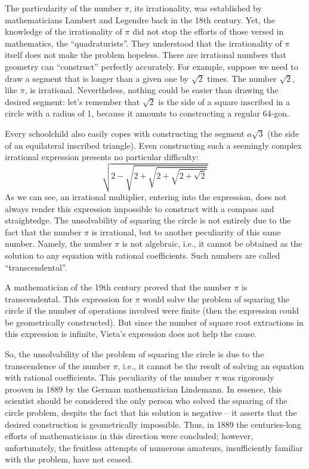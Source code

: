 The particularity of the number $\pi$, its irrationality, was established by mathematicians Lambert and Legendre back in the 18th century. Yet, the knowledge of the irrationality of $\pi$ did not stop the efforts of those versed in mathematics, the ``quadraturists''. They understood that the irrationality of $\pi$ itself does not make the problem hopeless. There are irrational numbers that geometry can ``construct'' perfectly accurately. For example, suppose we need to draw a segment that is longer than a given one by $\sqrt{2}$ times. The number $\sqrt{2}$, like $\pi$, is irrational. Nevertheless, nothing could be easier than drawing the desired segment: let's remember that $\sqrt{2}$ is the side of a square inscribed in a circle with a radius of 1, because it amounts to constructing a regular 64-gon.



Every schoolchild also easily copes with constructing the segment $ a \sqrt{3}$ (the side of an equilateral inscribed triangle). Even constructing such a seemingly complex irrational expression presents no particular difficulty:
\begin{equation*}%
\sqrt{2 - \sqrt{2 + \sqrt{2 + \sqrt{2 +\sqrt{2}}}}}
\end{equation*}
As we can see, an irrational multiplier, entering into the expression, does not always render this expression impossible to construct with a compass and straightedge. The unsolvability of squaring the circle is not entirely due to the fact that the number $\pi$ is irrational, but to another peculiarity of this same number. Namely, the number $\pi$ is not algebraic, i.e., it cannot be obtained as the solution to any equation with rational coefficients. Such numbers are called ``transcendental''.

A mathematician of the 19th century proved that the number $\pi$ is transcendental. This expression for $\pi$ would solve the problem of squaring the circle if the number of operations involved were finite (then the expression could be geometrically constructed). But since the number of square root extractions in this expression is infinite, Vieta's expression does not help the cause.

So, the unsolvability of the problem of squaring the circle is due to the transcendence of the number $\pi$, i.e., it cannot be the result of solving an equation with rational coefficients. This peculiarity of the number $\pi$ was rigorously prooven in 1889 by the German mathematician Lindemann. In essence, this scientist should be considered the only person who solved the squaring of the circle problem, despite the fact that his solution is negative -- it asserts that the desired construction is geometrically impossible. Thus, in 1889 the centuries-long efforts of mathematicians in this direction were concluded; however, unfortunately, the fruitless attempts of numerous amateurs, insufficiently familiar with the problem, have not ceased.

